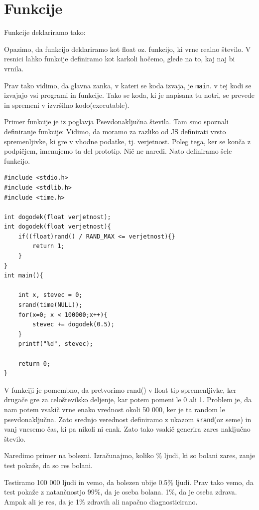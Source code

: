 \documentclass[a4paper, 12pt]{article}
\begin{document}
\section{Funkcije}
Funkcije deklariramo tako:

\begin{center}
\end{center}

Opazimo, da funkcijo deklariramo kot float oz. funkcijo, ki vrne realno število. V resnici lahko funkcije definiramo kot karkoli hočemo, glede na to, kaj naj bi vrnila.

Prav tako vidimo, da glavna zanka, v kateri se koda izvaja, je \texttt{main}. v tej kodi se izvajajo vsi programi in funkcije. Tako se koda, ki je napisana tu notri, se prevede in spremeni v izvršilno kodo(executable).

Primer funkcije je iz poglavja Psevdonaključna števila. Tam smo spoznali definiranje funkcije:
 Vidimo, da moramo za razliko od JS definirati vrsto spremenljivke, ki gre v vhodne podatke, tj. verjetnost. Poleg tega, ker se konča z podpičjem, imenujemo ta del prototip. Nič ne naredi. Nato definiramo šele funkcijo.

\begin{lstlisting}
#include <stdio.h>
#include <stdlib.h>
#include <time.h>

int dogodek(float verjetnost);
int dogodek(float verjetnost){
	if((float)rand() / RAND_MAX <= verjetnost){}
		return 1;
	}
}
int main(){

	int x, stevec = 0;
	srand(time(NULL));
	for(x=0; x < 100000;x++){
		stevec += dogodek(0.5);
	}
	printf("%d", stevec);

	return 0;
}
\end{lstlisting}

V funkciji je pomembno, da pretvorimo rand() v float tip spremenljivke, ker drugače gre za celoštevilsko deljenje, kar potem pomeni le 0 ali 1. Problem je, da nam potem vsakič vrne enako vrednost okoli 50 000, ker je ta random le psevdonaključna. Zato srednjo verednost definiramo z ukazom \texttt{srand}(oz seme) in vanj vnesemo čas, ki pa nikoli ni enak. Zato tako vsakič generira zares naključno število.

Naredimo primer na bolezni. Izračunajmo, koliko \% ljudi, ki so bolani zares, zanje test pokaže, da so res bolani.

Testiramo 100 000 ljudi in vemo, da bolezen ubije 0.5\% ljudi. Prav tako vemo, da test pokaže z natančnostjo 99\%, da je oseba bolana. 1\%, da je oseba zdrava. Ampak ali je res, da je 1\% zdravih ali napačno diagnosticirano.
\end{document}
